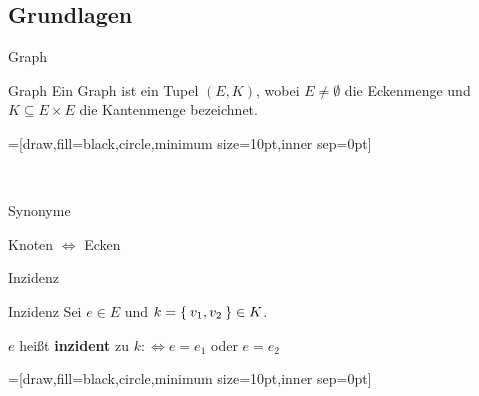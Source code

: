 \subsection{Grundlagen}
\begin{frame}{Graph}
\begin{block}{Graph}
Ein Graph ist ein Tupel $(E, K)$, wobei $E \neq \emptyset$ die Eckenmenge und 
$K \subseteq E \times E$ die 
Kantenmenge bezeichnet.
\end{block}
\pause
{}=[draw,fill=black,circle,minimum size=10pt,inner sep=0pt]

\begin{gallery}
    \\
\end{gallery}
\end{frame}

\begin{frame}{Synonyme}

\begin{center}
\Huge{Knoten $\Leftrightarrow$ Ecken}
\end{center}

\end{frame}

\begin{frame}{Inzidenz}
\begin{block}{Inzidenz}
Sei $e \in E$ und $k = \Set{v_1, v_2} \in K$.

$e$ heißt \textbf{inzident} zu $k :\Leftrightarrow e = e_1$ oder $e = e_2$
\end{block}

\pause
{}=[draw,fill=black,circle,minimum size=10pt,inner sep=0pt]

\begin{gallery}
    \\
\end{gallery}
\end{frame}
